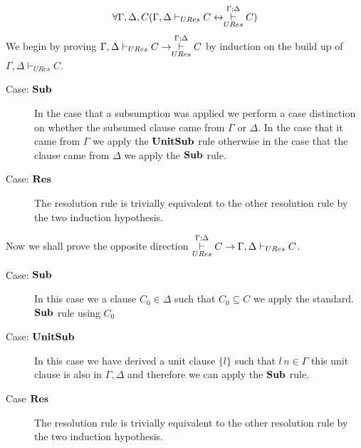 \begin{mytheorem}
\begin{align*}
\forall \Gamma,\Delta,C ( \Gamma,\Delta \vdash_{URes} C  \leftrightarrow   \overset{\Gamma;\Delta}{\underset{URes}{\vdash}} C )
\end{align*}
 We begin by proving $\Gamma,\Delta \vdash_{URes} C  \to   \overset{\Gamma;\Delta}{\underset{URes}{\vdash}} C$ by induction on the build up of $\Gamma, \Delta \vdash_{URes} C$.
\begin{description}

\item[Case: $\mathbf{Sub}$]
In the case that a subsumption was applied we perform a case distinction on whether the subsumed clause came from $\Gamma$ or $\Delta$. In the case that it came from $\Gamma$ we apply the $\mathbf{UnitSub}$ rule otherwise in the  case that the clause came from $\Delta$ we apply the $\mathbf{Sub}$ rule.
\item[Case: $\mathbf{Res}$]
The resolution rule is trivially equivalent to the other resolution rule by the two induction hypothesis.
\end{description}
Now we shall prove the opposite direction   $\overset{\Gamma;\Delta}{\underset{URes}{\vdash}} C \to \Gamma,\Delta \vdash_{URes} C $.
\begin{description}
\item[Case: $\mathbf{Sub}$]
In this case we a clause $C_0 \in \Delta$ such that $C_0 \subseteq C$ we apply the standard. $\mathbf{Sub}$ rule using $C_0$
\item[Case: $\mathbf{UnitSub}$]
In this case we have derived a unit clause $\{ l \}$ such that $l \, n \in \Gamma$ this unit clause is also in $\Gamma,\Delta$ and therefore we can apply the  $\mathbf{Sub}$ rule.
\item[Case $\mathbf{Res}$]
The resolution rule is trivially equivalent to the other resolution rule by the two induction hypothesis.
\end{description}

\end{mytheorem}




